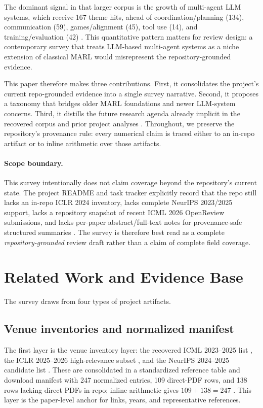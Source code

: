 \documentclass[11pt]{article}
\begin{document}
The dominant signal in that larger corpus is the growth of multi-agent LLM systems, which receive 167 theme hits, ahead of coordination/planning (134), communication (59), games/alignment (45), tool use (14), and training/evaluation (42) \cite{theme_synthesis}. This quantitative pattern matters for review design: a contemporary survey that treats LLM-based multi-agent systems as a niche extension of classical MARL would misrepresent the repository-grounded evidence.

This paper therefore makes three contributions. First, it consolidates the project's current repo-grounded evidence into a single survey narrative. Second, it proposes a taxonomy that bridges older MARL foundations and newer LLM-system concerns. Third, it distills the future research agenda already implicit in the recovered corpus and prior project analyses \cite{future_directions}. Throughout, we preserve the repository's provenance rule: every numerical claim is traced either to an in-repo artifact or to inline arithmetic over those artifacts.

\paragraph{Scope boundary.}
This survey intentionally does not claim coverage beyond the repository's current state. The project README and task tracker explicitly record that the repo still lacks an in-repo ICLR 2024 inventory, lacks complete NeurIPS 2023/2025 support, lacks a repository snapshot of recent ICML 2026 OpenReview submissions, and lacks per-paper abstract/full-text notes for provenance-safe structured summaries \cite{project_readme,project_tasks}. The survey is therefore best read as a complete \emph{repository-grounded} review draft rather than a claim of complete field coverage.

\section{Related Work and Evidence Base}
The survey draws from four types of project artifacts.

\subsection{Venue inventories and normalized manifest}
The first layer is the venue inventory layer: the recovered ICML 2023--2025 list \cite{icml_list}, the ICLR 2025--2026 high-relevance subset \cite{iclr_subset}, and the NeurIPS 2024--2025 candidate list \cite{neurips_list}. These are consolidated in a standardized reference table and download manifest with 247 normalized entries, 109 direct-PDF rows, and 138 rows lacking direct PDFs in-repo; inline arithmetic gives $109 + 138 = 247$ \cite{manifest}. This layer is the paper-level anchor for links, years, and representative references.
\end{document}
